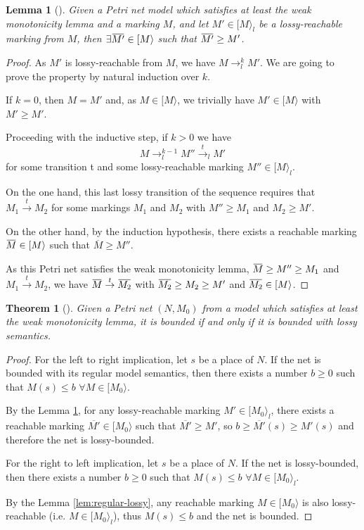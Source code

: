 \documentclass{article}
\newtheorem{lemma}{Lemma}
\newtheorem{theorem}{Theorem}
\newcommand{\overbar}[1]{
  \mkern 1.5mu\overline{
    \mkern-1.5mu#1\mkern-1.5mu
  }\mkern 1.5mu
}
\begin{document}
\begin{lemma}[]\label{lem:lossy-smaller}
  Given a Petri net model which satisfies at least the weak 
  monotonicity lemma and a marking $M$, and let 
  $M' \in [M\rangle_l$ be a lossy-reachable marking from $M$, then 
  $\exists \overbar{M'} \in [M\rangle$ such that $\overbar{M'} 
  \geq M'$. 
\end{lemma}
\begin{proof}
  As $M'$ is lossy-reachable from $M$, we have 
  $M \rightarrow^k_l M'$. We are going to prove the property
  by natural induction over $k$.

  If $k = 0$, then $M = M'$ and, as $M \in [M\rangle$,
  we trivially have $M' \in [M\rangle$ with $M' \geq M'$.

  Proceeding with the inductive step, if $k > 0$ we have 
  $$M \rightarrow_l^{k-1} M'' \stackrel{t}{\rightarrow}_l M'$$
  for some transition t and some lossy-reachable marking 
  $M'' \in [M\rangle_l$.

  On the one hand, this last lossy transition of the sequence
  requires that $M_1 \stackrel{t}{\rightarrow} M_2$ for some 
  markings $M_1$ and $M_2$ with $M'' \geq M_1$ and 
  $M_2 \geq M'$.

  On the other hand, by the induction hypothesis, there exists 
  a reachable marking $\overbar{M} \in [M\rangle$ such that 
  $\overline{M} \geq M''$.

  As this Petri net satisfies the weak monotonicity lemma,
  $\overbar{M} \geq M'' \geq M_1$ and 
  $M_1 \stackrel{t}{\rightarrow} M_2$,  we have 
  $\overbar{M} \stackrel{t}{\rightarrow} \overbar{M_2}$
  with $\overbar{M_2} \geq M_2 \geq M'$ and 
  $\overbar{M_2} \in [M\rangle$.
\end{proof}

\begin{theorem}[]\label{teo:bounded}
  Given a Petri net $(N, M_0)$ from a model which satisfies 
  at least the weak monotonicity lemma, it is bounded if and 
  only if it is bounded with lossy semantics.
\end{theorem}
\begin{proof}
  For the left to right implication, let $s$ be a place of $N$. 
  If the net is bounded with its regular model semantics, then 
  there exists a number $b \geq 0$ such that $M(s) \leq b$ 
  $\forall M \in [M_0\rangle$.

  By the Lemma \ref{lem:lossy-smaller}, for any lossy-reachable
  marking $M' \in [M_0\rangle_l$, there exists a reachable marking
  $\overline{M'} \in [M_0\rangle$ such that $\overline{M'} \geq M'$,
  so $b \geq \overline{M'}(s) \geq M'(s)$ and therefore the net is 
  lossy-bounded.

  For the right to left implication, let $s$ be a place of $N$. 
  If the net is lossy-bounded, then there exists a number 
  $b \geq 0$ such that $M(s) \leq b$ $\forall M \in [M_0\rangle_l$.

  By the Lemma \ref{lem:regular-lossy}, any reachable marking 
  $M \in [M_0\rangle$ is also lossy-reachable 
  (i.e. $M \in [M_0\rangle_l$), thus $M(s) \leq b$ and the net 
  is bounded.
\end{proof}
\end{document}
